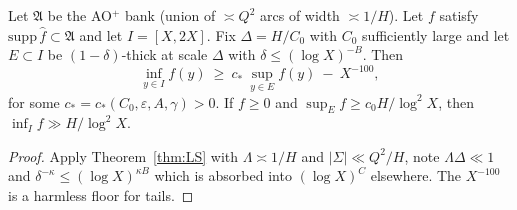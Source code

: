 \begin{corollary}\label{cor:bank-sampling}
Let $\mathfrak A$ be the AO$^+$ bank (union of $\asymp Q^2$ arcs of width $\asymp 1/H$). Let $f$ satisfy $\mathrm{supp}\,\widehat f\subset\mathfrak A$ and let $I=[X,2X]$.
Fix $\Delta=H/C_0$ with $C_0$ sufficiently large and let $E\subset I$ be $(1-\delta)$-thick at scale $\Delta$ with $\delta\le (\log X)^{-B}$.
Then
\[
\inf_{y\in I} f(y)\ \ge\ c_*\ \sup_{y\in E} f(y)\ -\ X^{-100},
\]
for some $c_*=c_*(C_0,\varepsilon,A,\gamma)>0$. If $f\ge 0$ and $\sup_E f\ge c_0 H/\log^2X$, then $\inf_I f\gg H/\log^2X$.
\end{corollary}

\begin{proof}
Apply Theorem~\ref{thm:LS} with $\Lambda\asymp 1/H$ and $|\Sigma|\ll Q^2/H$, note $\Lambda\Delta\ll 1$ and $\delta^{-\kappa}\le (\log X)^{\kappa B}$ which is absorbed into $(\log X)^C$ elsewhere. The $X^{-100}$ is a harmless floor for tails.
\end{proof}

